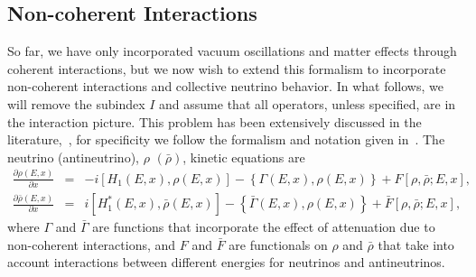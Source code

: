\documentclass[3p,12pt]{elsarticle}
\newcommand{\pa}[2]{\frac{\partial #1}{\partial #2}}
\begin{document}
\subsection{Non-coherent Interactions}
So far, we have only incorporated vacuum oscillations and matter
effects through coherent interactions, but we now wish to extend this
formalism to incorporate non-coherent interactions and collective
neutrino behavior. In what follows, we will remove the subindex $I$ and
assume that all operators, unless specified, are in the interaction picture. 
This problem has been extensively discussed in the literature,~\citep{Sigl:1992fn,Duan:2010tk,Strack:qd,Zhang:2013ay,
 Cirelli:mw,Blennow:2007tw,Arguelles:2012cf}, for specificity we
follow the formalism and notation given in~\citep{Gonzalez-Garcia:2005xw}.
The neutrino (antineutrino), $\rho$ $(\bar\rho)$, kinetic equations are
\begin{subequations}
\begin{eqnarray}
\pa{\rho(E,x)}{x} &=& -i [ H_1 (E,x), \rho(E,x) ] - \left\{ \Gamma(E,x),
  \rho(E,x) \right\} + F\left[\rho,\bar\rho;E,x\right] ,\\
%
\pa{\bar\rho(E,x)}{x} &=& i [ H^*_1 (E,x), \bar\rho(E,x) ] - \left\{ \bar\Gamma(E,x),
  \rho(E,x) \right\} + \bar F\left[\rho,\bar\rho;E,x\right] ,
\end{eqnarray}
\label{eq:kinetic_equations}
\end{subequations}
where $\Gamma$ and $\bar\Gamma$  are functions that incorporate the effect of attenuation due to
non-coherent interactions, and $F$ and $\bar F$  are  functionals on
$\rho$ and $\bar\rho$ that take into account interactions between
different energies for neutrinos and antineutrinos.
\end{document}

